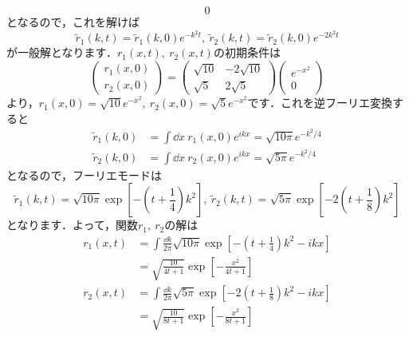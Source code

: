 \documentclass[a4paper,pdflatex,ja=standard]{bxjsarticle}
\begin{document}
\begin{enumerate}
\begin{equation}
    0
  \end{equation}
  となるので，これを解けば
  \begin{equation}
    \tilde{r}_1(k,t)
    =
    \tilde{r}_1(k,0)e^{-k^2 t}
    ,\ 
    \tilde{r}_2(k,t)
    =
    \tilde{r}_2(k,0)e^{-2k^2 t}
  \end{equation}
  が一般解となります．$r_1(x,t),\ r_2(x,t)$の初期条件は
  \begin{equation}
    \begin{pmatrix}
      r_1(x,0) \\
      r_2(x,0)
    \end{pmatrix}
    =
    \begin{pmatrix}
      \sqrt{10} & -2\sqrt{10} \\
      \sqrt{5} & 2\sqrt{5}
    \end{pmatrix}
    \begin{pmatrix}
      e^{-x^2} \\
      0
    \end{pmatrix}
  \end{equation}
  より，$r_1(x,0)=\sqrt{10}e^{-x^2},\ r_2(x,0)=\sqrt{5}e^{-x^2}$です．これを逆フーリエ変換すると
  \begin{align}
    \tilde{r}_1(k,0)
    &=
    \int\dd x\ 
    r_1(x,0) e^{ikx}
    =
    \sqrt{10\pi}e^{-k^2/4}
    \nonumber
    \\
    \tilde{r}_2(k,0)
    &=
    \int\dd x\ 
    r_2(x,0) e^{ikx}
    =
    \sqrt{5\pi}e^{-k^2/4}
  \end{align}
  となるので，フーリエモードは
  \begin{equation}
    \tilde{r}_1(k,t)
    =
    \sqrt{10\pi}\exp
    \left[  
      -\left( t+\frac{1}{4} \right)k^2
    \right]
    ,\ 
    \tilde{r}_2(k,t)
    =
    \sqrt{5\pi}\exp
    \left[  
      -2\left( t+\frac{1}{8} \right)k^2
    \right]
  \end{equation}
  となります．よって，関数$r_1,\ r_2$の解は
  \begin{align}
    r_1(x,t)
    &=
    \int\frac{\dd k}{2\pi}
    \sqrt{10\pi}\exp
    \left[  
      -\left( t+\frac{1}{4} \right)k^2
      -ikx
    \right]    
    \nonumber
    \\
    &=
    \sqrt{\frac{10}{4t+1}}\exp\left[ -\frac{x^2}{4t+1} \right]
    \\
    r_2(x,t)
    &=
    \int\frac{\dd k}{2\pi}
    \sqrt{5\pi}\exp
    \left[  
      -2\left( t+\frac{1}{8} \right)k^2
      -ikx
    \right]
    \nonumber
    \\
    &=
    \sqrt{\frac{10}{8t+1}}\exp\left[ -\frac{x^2}{8t+1} \right]

\end{align}
\end{enumerate}
\end{document}
